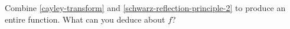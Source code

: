 \documentclass{homework}
\begin{document}
\begin{problem}
                                                                                                                                                                                                                                                                                                                            Combine \ref{cayley-transform} and
                                                                                                                                                                                                                                                                                                                              \ref{schwarz-reflection-principle-2} to produce an entire function.
                                                                                                                                                                                                                                                                                                                                What can you deduce about $f$?
                                                                                                                                                                                                                                                                                                                                \end{problem}
\end{document}
